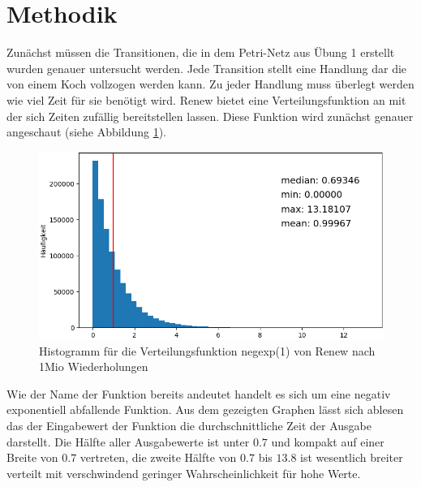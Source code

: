 \section*{Methodik} %
\label{sec:methodik}
Zunächst müssen die Transitionen, die in dem Petri-Netz aus Übung 1 erstellt wurden genauer untersucht werden. Jede Transition stellt eine Handlung dar die von einem Koch vollzogen werden kann. Zu jeder Handlung muss überlegt werden wie viel Zeit für sie benötigt wird. Renew bietet eine Verteilungsfunktion an mit der sich Zeiten zufällig bereitstellen lassen. Diese Funktion wird zunächst genauer angeschaut (siehe Abbildung \ref{pic:negexp}).

\begin{figure}[ht]
  \includegraphics[width=1\textwidth]{pics/negexp.png}
  \caption{Histogramm für die Verteilungsfunktion negexp(1) von Renew nach 1Mio Wiederholungen }
  \label{pic:negexp}
\end{figure}

Wie der Name der Funktion bereits andeutet handelt es sich um eine negativ exponentiell abfallende Funktion. Aus dem gezeigten Graphen lässt sich ablesen das der Eingabewert der Funktion die durchschnittliche Zeit der Ausgabe darstellt. Die Hälfte aller Ausgabewerte ist unter $0.7$ und kompakt auf einer Breite von $0.7$ vertreten, die zweite Hälfte von $0.7$ bis $13.8$ ist wesentlich breiter verteilt mit verschwindend geringer Wahrscheinlichkeit für hohe Werte. 

